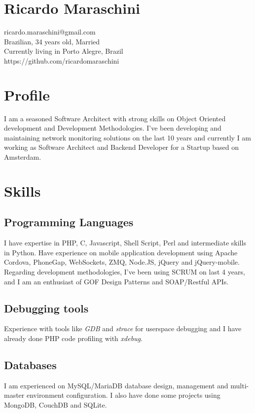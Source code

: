 \documentclass{article}
\begin{document}
\begin{multicols}{2}

\section{Ricardo Maraschini}
ricardo.maraschini@gmail.com\\
Brazilian, 34 years old, Married\\
Currently living in Porto Alegre, Brazil\\
https://github.com/ricardomaraschini

\section{Profile}
I am a seasoned Software Architect with strong skills on Object Oriented
development and Development Methodologies. I've been developing and maintaining
network monitoring solutions on the last 10 years and currently I am
working as Software Architect and Backend Developer for a Startup based on
Amsterdam.

\section{Skills}
\subsection{Programming Languages}
I have expertise in PHP, C, Javascript, Shell Script, Perl and intermediate
skills in Python. Have experience on mobile application development using Apache 
Cordova, PhoneGap, WebSockets, ZMQ, Node.JS, jQuery and jQuery-mobile. Regarding
development methodologies, I've been using SCRUM on last 4 years, and I am an 
enthusiast of GOF Design Patterns and SOAP/Restful APIs.  

\subsection{Debugging tools}
Experience with tools like \textit{GDB} and \textit{strace} for userspace 
debugging and I have already done PHP code profiling with \textit{xdebug}.

\subsection{Databases}
I am experienced on MySQL/MariaDB database design, management and multi-master
environment configuration. I also have done some projects using MongoDB, CouchDB
and SQLite.


\end{multicols}
\end{document}

